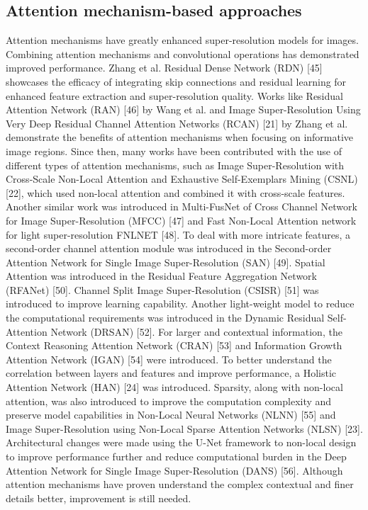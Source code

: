 \documentclass[twocolumn]{svjour3}          %
\begin{document}
\subsection{Attention mechanism-based approaches}
Attention mechanisms have greatly enhanced super-resolution models for images. Combining attention mechanisms and convolutional operations has demonstrated improved performance. Zhang et al. Residual Dense Network (RDN) [45] showcases the efficacy of integrating skip connections and residual learning for enhanced feature extraction and super-resolution quality. Works like Residual Attention Network (RAN) [46] by Wang et al. and Image Super-Resolution Using Very Deep Residual Channel Attention Networks (RCAN) [21] by Zhang et al. demonstrate the benefits of attention mechanisms when focusing on informative image regions. Since then, many works have been contributed with the use of different types of attention mechanisms, such as Image Super-Resolution with Cross-Scale Non-Local Attention and Exhaustive Self-Exemplars Mining (CSNL) [22], which used non-local attention and combined it with cross-scale features. Another similar work was introduced in Multi-FusNet of Cross Channel Network for Image Super-Resolution (MFCC) [47] and Fast Non-Local Attention network for light super-resolution FNLNET [48]. To deal with more intricate features, a second-order channel attention module was introduced in the Second-order Attention Network for Single Image Super-Resolution (SAN) [49]. Spatial Attention was introduced in the Residual Feature Aggregation Network (RFANet) [50]. Channel Split Image Super-Resolution (CSISR) [51] was introduced to improve learning capability. Another light-weight model to reduce the computational requirements was introduced in the Dynamic Residual Self-Attention Network (DRSAN) [52]. For larger and contextual information, the Context Reasoning Attention Network (CRAN) [53] and Information Growth Attention Network (IGAN) [54] were introduced. To better understand the correlation between layers and features and improve performance, a Holistic Attention Network (HAN) [24] was introduced. Sparsity, along with non-local attention, was also introduced to improve the computation complexity and preserve model capabilities in Non-Local Neural Networks (NLNN) [55] and Image Super-Resolution using Non-Local Sparse Attention Networks (NLSN) [23]. Architectural changes were made using the U-Net framework to non-local design to improve performance further and reduce computational burden in the Deep Attention Network for Single Image Super-Resolution (DANS) [56]. Although attention mechanisms have proven understand the complex contextual and finer details better, improvement is still needed. 
\end{document}
